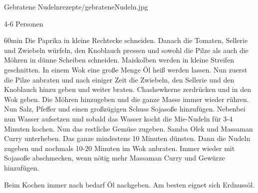 \documentclass[fontsize=11pt,a4paper,toc=bibliography,listof=totoc]{scrbook}
\begin{document}
	
\begin{Rezept}{Gebratene Nudeln}{rezepte/gebrateneNudeln.jpg}		
	\begin{zutaten}{4-6 Personen}
	\end{zutaten}		
	\begin{zubereitung}{60min}
Die Paprika in kleine Rechtecke schneiden. Danach die Tomaten, Sellerie und Zwiebeln würfeln, den Knoblauch pressen und sowohl die Pilze als auch die Möhren in dünne Scheiben schneiden. Maiskolben werden in kleine Streifen geschnitten. In einem Wok eine große Menge Öl heiß werden lassen. Nun zuerst die Pilze anbraten und nach einiger Zeit die Zwiebeln, den Sellerie und den Knoblauch hinzu geben und weiter braten. Chashewkerne zerdrücken und in den Wok geben. Die Möhren hinzugeben und die ganze Masse immer wieder rühren. Nun Salz, Pfeffer und einen großzügigen Schuss Sojasoße hinzufügen. Nebenbei nun Wasser aufsetzen und sobald das Wasser kocht die Mie-Nudeln für 3-4 Minuten kochen. Nun das restliche Gemüse zugeben. Samba Olek und Massaman Curry unterheben. Das ganze mindestens 10 Minuten dünsten. Dann die Nudeln zugeben und nochmals 10-20 Minuten im Wok anbraten. Immer wieder mit Sojasoße abschmecken, wenn nötig mehr Massaman Curry und Gewürze hinzufügen.
		
Beim Kochen immer nach bedarf Öl nachgeben. Am besten eignet sich Erdnussöl.
\end{zubereitung}
\end{Rezept}
\end{document}
